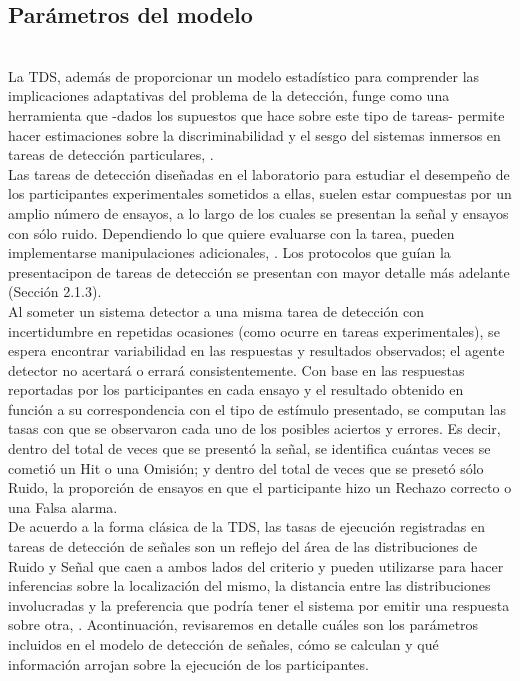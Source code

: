 \subsection{Parámetros del modelo}\\

La TDS, además de proporcionar un modelo estadístico para comprender las implicaciones adaptativas del problema de la detección, funge como una herramienta que -dados los supuestos que hace sobre este tipo de tareas- permite hacer estimaciones sobre la discriminabilidad y el sesgo del sistemas inmersos en tareas de detección particulares, \parencite{Stainslaw1999, McNicol1}.\\

Las tareas de detección diseñadas en el laboratorio para estudiar el desempeño de los participantes experimentales sometidos a ellas, suelen estar compuestas por un amplio número de ensayos, a lo largo de los cuales se presentan la señal y ensayos con sólo ruido. Dependiendo lo que quiere evaluarse con la tarea, pueden implementarse manipulaciones adicionales, \parencite{Nevin1969}. Los protocolos que guían la presentacipon de tareas de detección se presentan con mayor detalle más adelante (Sección 2.1.3).\\

Al someter un sistema detector a una misma tarea de detección con incertidumbre en repetidas ocasiones (como ocurre en tareas experimentales), se espera encontrar variabilidad en las respuestas y resultados observados; el agente detector no acertará o errará consistentemente. Con base en las respuestas reportadas por los participantes en cada ensayo y el resultado obtenido en función a su correspondencia con el tipo de estímulo presentado, se computan las tasas con que se observaron cada uno de los posibles aciertos y errores. Es decir, dentro del total de veces que se presentó la señal, se identifica cuántas veces se cometió un Hit o una Omisión; y dentro del total de veces que se presetó sólo Ruido, la proporción de ensayos en que el participante hizo un Rechazo correcto o una Falsa alarma.\\

De acuerdo a la forma clásica de la TDS, las tasas de ejecución registradas en tareas de detección de señales son un reflejo del área de las distribuciones de Ruido y Señal que caen a ambos lados del criterio y pueden utilizarse para hacer inferencias sobre la localización del mismo, la distancia entre las distribuciones involucradas y la preferencia que podría tener el sistema por emitir una respuesta sobre otra, \parencite{Wickens, McNicol1, Gescheider, Stainslaw1999}. Acontinuación, revisaremos en detalle cuáles son los parámetros incluidos en el modelo de detección de señales, cómo se calculan y qué información arrojan sobre la ejecución de los participantes.\\

